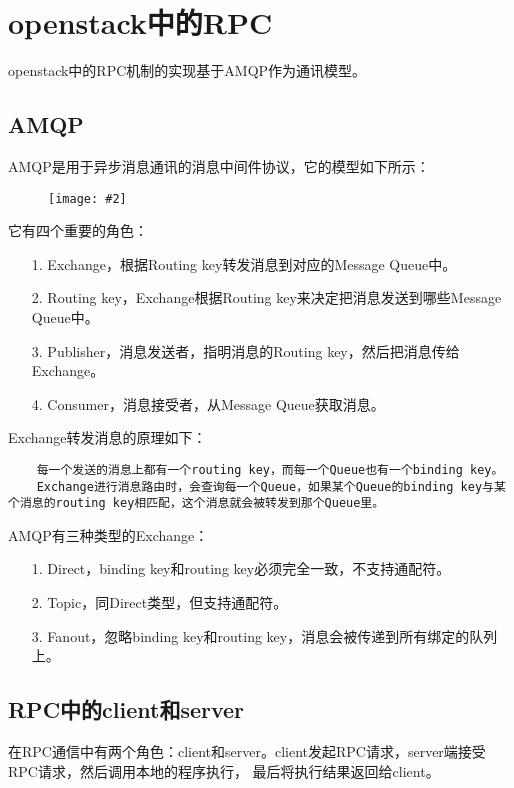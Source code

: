 \documentclass[a4paper,left=1.5cm,right=1.5cm,11pt]{article}
\newcommand{\sizedfic}[2]{\begin{figure}[H]
		\center
		\texttt{[image: \#2]}
	\end{figure}}
\begin{document}
\tableofcontents

\clearpage

\section{openstack中的RPC}
	openstack中的RPC机制的实现基于AMQP作为通讯模型。

\subsection{AMQP}
	AMQP是用于异步消息通讯的消息中间件协议，它的模型如下所示：
	\sizedfic{0.7}{1.png}
	
	它有四个重要的角色：
	\begin{itemize}
		\item[1.] Exchange，根据Routing key转发消息到对应的Message Queue中。
		\item[2.] Routing key，Exchange根据Routing key来决定把消息发送到哪些Message Queue中。
		\item[3.] Publisher，消息发送者，指明消息的Routing key，然后把消息传给Exchange。
		\item[4.] Consumer，消息接受者，从Message Queue获取消息。
	\end{itemize}

	Exchange转发消息的原理如下：
	\begin{lstlisting}
	每一个发送的消息上都有一个routing key，而每一个Queue也有一个binding key。
	Exchange进行消息路由时，会查询每一个Queue，如果某个Queue的binding key与某个消息的routing key相匹配，这个消息就会被转发到那个Queue里。
	\end{lstlisting}

	AMQP有三种类型的Exchange：
	\begin{itemize}
		\item[1.] Direct，binding key和routing key必须完全一致，不支持通配符。
		\item[2.] Topic，同Direct类型，但支持通配符。
		\item[3.] Fanout，忽略binding key和routing key，消息会被传递到所有绑定的队列上。
	\end{itemize}

\clearpage

\subsection{RPC中的client和server}
	在RPC通信中有两个角色：client和server。client发起RPC请求，server端接受RPC请求，然后调用本地的程序执行，
	最后将执行结果返回给client。\par
\end{document}
